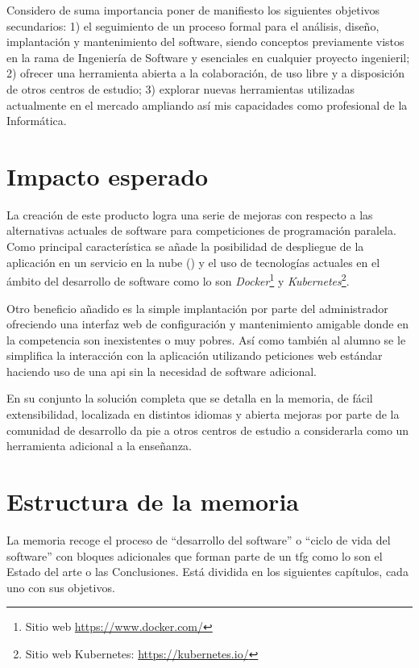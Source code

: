 \documentclass[11pt,spanish,listoffigures,listoftables]{tfgetsinf}
\begin{document}
Considero de suma importancia poner de manifiesto los siguientes objetivos secundarios: 1) el seguimiento de un proceso formal para el análisis, diseño, implantación y mantenimiento del software, siendo conceptos previamente vistos en la rama de Ingeniería de Software y esenciales en cualquier proyecto ingenieril; 2) ofrecer una herramienta  abierta a la colaboración, de uso libre y a disposición de otros centros de estudio; 3) explorar nuevas herramientas utilizadas actualmente en el mercado ampliando así mis capacidades como profesional de la Informática.

\section{Impacto esperado}

La creación de este producto logra una serie de mejoras con respecto a las alternativas actuales de software para competiciones de programación paralela. Como principal característica se añade la posibilidad de despliegue de la aplicación en un servicio en la nube () y el uso de tecnologías actuales en el ámbito del desarrollo de software como lo son \textit{Docker}\footnote{Sitio web \url{https://www.docker.com/}} y \textit{Kubernetes}\footnote{Sitio web Kubernetes: \url{https://kubernetes.io/}}.

Otro beneficio añadido es la simple implantación por parte del \gls{administrador} ofreciendo una interfaz web de configuración y mantenimiento amigable donde en la competencia son inexistentes o muy pobres. Así como también al \gls{alumno} se le simplifica la interacción con la aplicación utilizando peticiones web estándar haciendo uso de una \acrshort{api} sin la necesidad de software adicional.

En su conjunto la solución completa que se detalla en la memoria, de fácil extensibilidad, localizada en distintos idiomas y abierta mejoras por parte de la comunidad de desarrollo da pie a otros centros de estudio a considerarla como un herramienta adicional a la enseñanza.

\section{Estructura de la memoria}

La memoria recoge el proceso de ``desarrollo del software'' o ``ciclo de vida del software'' con bloques adicionales que forman parte de un \acrshort{tfg} como lo son el Estado del arte o las Conclusiones. Está dividida en los siguientes capítulos, cada uno con sus objetivos.
\end{document}

